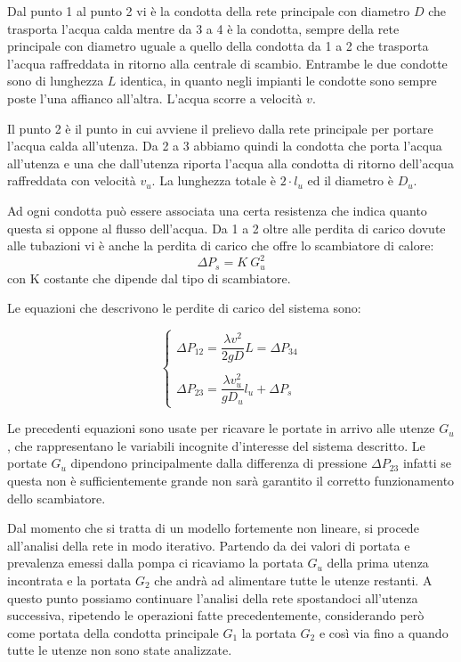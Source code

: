 \documentclass[laurea,oneside,11pt]{USiena_tesiLM}
\begin{document}
Dal punto 1 al punto 2 vi è la condotta della rete principale con diametro $D$ che trasporta l'acqua calda mentre da 3 a 4 è la condotta, sempre della rete principale con diametro uguale a quello della condotta da 1 a 2 che trasporta l'acqua raffreddata in ritorno alla centrale di scambio. Entrambe le due condotte sono di lunghezza $L$ identica, in quanto negli impianti le condotte sono sempre poste l'una affianco all'altra. L'acqua scorre a velocità $v$.

Il punto 2 è il punto in cui avviene il prelievo dalla rete principale per portare l'acqua calda all'utenza. Da 2 a 3 abbiamo quindi la condotta che porta l'acqua all'utenza e una che dall'utenza riporta l'acqua alla condotta di ritorno dell'acqua raffreddata con velocità $v_u$. La lunghezza totale è $2 \cdot l_u$ ed il diametro è $D_u$.

Ad ogni condotta può essere associata una certa resistenza che  indica quanto questa si oppone al flusso dell'acqua. Da 1 a 2 oltre alle perdita di carico dovute alle tubazioni vi è anche la perdita di carico che offre lo scambiatore di calore:
\begin{equation}
\Delta P_s = K \ G^2_u
\end{equation}
con K costante che dipende dal tipo di scambiatore.

Le equazioni che descrivono le perdite di carico del sistema sono:

\begin{equation}
\begin{cases}
\Delta P_{12} = \dfrac{\lambda v^2}{2 g D} L = \Delta P_{34} \\
\\
\Delta P_{23} = \dfrac{\lambda v_u^2}{ g D_u} l_u + \Delta P_s
\end{cases}
\end{equation}

Le precedenti equazioni sono usate per ricavare le portate in arrivo alle utenze $G_u$, che rappresentano le variabili incognite d'interesse del sistema descritto. Le portate $G_u$ dipendono principalmente dalla differenza di pressione $\Delta P_{23}$ infatti se questa non è sufficientemente grande non sarà garantito il corretto funzionamento dello scambiatore.

Dal momento che si tratta di un modello fortemente non lineare, si procede all'analisi della rete in modo iterativo. Partendo da dei valori di portata e prevalenza emessi dalla pompa ci ricaviamo la portata $G_u$ della prima utenza incontrata e la portata $G_2$ che andrà ad alimentare tutte le utenze restanti. A questo punto possiamo continuare l'analisi della rete spostandoci all'utenza successiva, ripetendo le operazioni fatte precedentemente, considerando però come portata della condotta principale $G_1$ la portata $G_2$ e così via fino a quando tutte le utenze non sono state analizzate.
\end{document}
